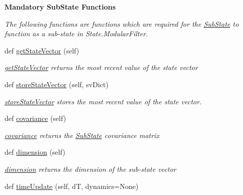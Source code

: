 \begin{Indent}{\bf Mandatory Sub\+State Functions}\par
{\em The following functions are functions which are required for the \hyperlink{classmodest_1_1substates_1_1SubState_1_1SubState}{Sub\+State} to function as a sub-\/state in State.\+Modular\+Filter. }\begin{DoxyCompactItemize}
\item 
def \hyperlink{classmodest_1_1substates_1_1SubState_1_1SubState_a26146efb15c1d33fee433df4725bae45}{get\+State\+Vector} (self)
\begin{DoxyCompactList}\small\item\em \hyperlink{classmodest_1_1substates_1_1SubState_1_1SubState_a26146efb15c1d33fee433df4725bae45}{get\+State\+Vector} returns the most recent value of the state vector \end{DoxyCompactList}\item 
def \hyperlink{classmodest_1_1substates_1_1SubState_1_1SubState_a00fad4cb7ed9699163f5a37ed34a3032}{store\+State\+Vector} (self, sv\+Dict)
\begin{DoxyCompactList}\small\item\em \hyperlink{classmodest_1_1substates_1_1SubState_1_1SubState_a00fad4cb7ed9699163f5a37ed34a3032}{store\+State\+Vector} stores the most recent value of the state vector. \end{DoxyCompactList}\item 
def \hyperlink{classmodest_1_1substates_1_1SubState_1_1SubState_af77dd1cc9f3c6cc9e5619a2f56ca0cdd}{covariance} (self)
\begin{DoxyCompactList}\small\item\em \hyperlink{classmodest_1_1substates_1_1SubState_1_1SubState_af77dd1cc9f3c6cc9e5619a2f56ca0cdd}{covariance} returns the \hyperlink{classmodest_1_1substates_1_1SubState_1_1SubState}{Sub\+State} covariance matrix \end{DoxyCompactList}\item 
def \hyperlink{classmodest_1_1substates_1_1SubState_1_1SubState_aaf7473d2ebcd61adf1b7bb2262eb31d1}{dimension} (self)
\begin{DoxyCompactList}\small\item\em \hyperlink{classmodest_1_1substates_1_1SubState_1_1SubState_aaf7473d2ebcd61adf1b7bb2262eb31d1}{dimension} returns the dimension of the sub-\/state vector \end{DoxyCompactList}\item 
def \hyperlink{classmodest_1_1substates_1_1SubState_1_1SubState_aea424eed4e6395ba3fcd5206d3f39bbe}{time\+Update} (self, dT, dynamics=None)

\end{DoxyCompactItemize}
\end{Indent}

